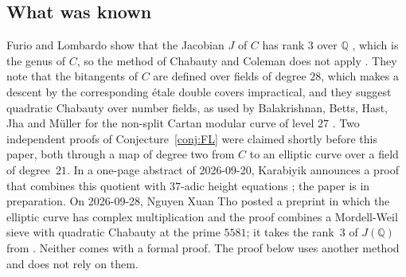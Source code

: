 \documentclass[11pt]{amsart}
\theoremstyle{definition}
\numberwithin{equation}{section}
\newcommand{\Q}{\mathbb{Q}}
\begin{document}
\subsection*{What was known}
Furio and Lombardo show that the Jacobian $J$ of $C$ has rank $3$ over $\Q$ \cite[Remark~6.3]{FL25}, which is the genus of $C$, so the method of Chabauty and Coleman does not apply \cite[Section~6.5]{FL25}. They note that the bitangents of $C$ are defined over fields of degree $28$, which makes a descent by the corresponding \'etale double covers impractical, and they suggest quadratic Chabauty over number fields, as used by Balakrishnan, Betts, Hast, Jha and M\"uller for the non-split Cartan modular curve of level $27$ \cite{BBHJM25}. Two independent proofs of Conjecture~\ref{conj:FL} were claimed shortly before this paper, both through a map of degree two from $C$ to an elliptic curve over a field of degree~$21$. In a one-page abstract of 2026-09-20, Karabiyik announces a proof that combines this quotient with $37$-adic height equations \cite{Karabiyik26}; the paper is in preparation. On 2026-09-28, Nguyen Xuan Tho posted a preprint \cite{NguyenXuanTho26} in which the elliptic curve has complex multiplication and the proof combines a Mordell-Weil sieve with quadratic Chabauty at the prime $5581$; it takes the rank~$3$ of $J(\Q)$ from \cite[Remark~6.3]{FL25}. Neither comes with a formal proof. The proof below uses another method and does not rely on them.
\end{document}
